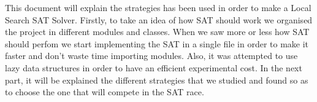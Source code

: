 
This document will explain the strategies has been used in order to make a Local Search SAT Solver. Firstly, to take an idea of how SAT should work we organised the project in different modules and classes. When we saw more or less how SAT should perfom we start implementing the SAT in a single file in order to make it faster and don't waste time importing modules. Also, it was attempted to use lazy data structures in order to have an efficient experimental cost. In the next part, it will be explained the different strategies that we studied and found so as to choose the one that will compete in the SAT race.

